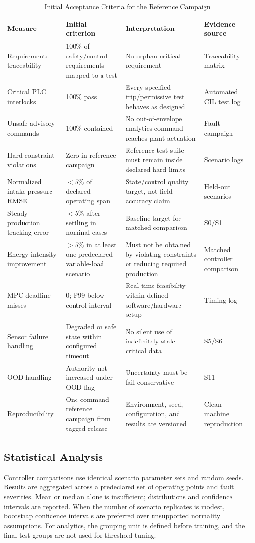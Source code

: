 \documentclass[conference]{IEEEtran}
\begin{document}
\begin{table}[t]
\caption{Initial Acceptance Criteria for the Reference Campaign}
\label{tab:criteria}
\centering
\footnotesize
\begin{tabularx}{\textwidth}{p{}p{}Y p{0.19\textwidth}}
\toprule
Measure & Initial criterion & Interpretation & Evidence source \\
\midrule
Requirements traceability & 100\% of safety/control requirements mapped to a test & No orphan critical requirement & Traceability matrix \\
Critical PLC interlocks & 100\% pass & Every specified trip/permissive test behaves as designed & Automated CIL test log \\
Unsafe advisory commands & 100\% contained & No out-of-envelope analytics command reaches plant actuation & Fault campaign \\
Hard-constraint violations & Zero in reference campaign & Reference test suite must remain inside declared hard limits & Scenario logs \\
Normalized intake-pressure RMSE & $<5\%$ of declared operating span & State/control quality target, not field accuracy claim & Held-out scenarios \\
Steady production tracking error & $<5\%$ after settling in nominal cases & Baseline target for matched comparison & S0/S1 \\
Energy-intensity improvement & $>5\%$ in at least one predeclared variable-load scenario & Must not be obtained by violating constraints or reducing required production & Matched controller comparison \\
MPC deadline misses & 0; P99 below control interval & Real-time feasibility within defined software/hardware setup & Timing log \\
Sensor failure handling & Degraded or safe state within configured timeout & No silent use of indefinitely stale critical data & S5/S6 \\
OOD handling & Authority not increased under OOD flag & Uncertainty must be fail-conservative & S11 \\
Reproducibility & One-command reference campaign from tagged release & Environment, seed, configuration, and results are versioned & Clean-machine reproduction \\
\bottomrule
\end{tabularx}
\end{table}

\subsection{Statistical Analysis}
Controller comparisons use identical scenario parameter sets and random seeds. Results are aggregated across a predeclared set of operating points and fault severities. Mean or median alone is insufficient; distributions and confidence intervals are reported. When the number of scenario replicates is modest, bootstrap confidence intervals are preferred over unsupported normality assumptions. For analytics, the grouping unit is defined before training, and the final test groups are not used for threshold tuning.
\end{document}
